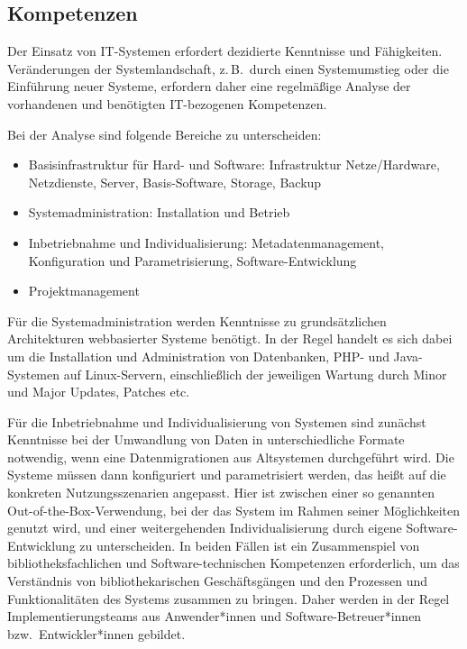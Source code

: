 \documentclass[
  11pt,
  letterpaper,
  DIV=11,
  twoside]{scrreprt}
\begin{document}
\subsection{Kompetenzen}\label{kompetenzen}

Der Einsatz von IT-Systemen erfordert dezidierte Kenntnisse und
Fähigkeiten. Veränderungen der Systemlandschaft, z.\,B.~durch einen
Systemumstieg oder die Einführung neuer Systeme, erfordern daher eine
regelmäßige Analyse der vorhandenen und benötigten IT-bezogenen
Kompetenzen.

Bei der Analyse sind folgende Bereiche zu unterscheiden:

\begin{itemize}
\item
  Basisinfrastruktur für Hard- und Software: Infrastruktur
  Netze/Hardware, Netzdienste, Server, Basis-Software, Storage, Backup
\item
  Systemadministration: Installation und Betrieb
\item
  Inbetriebnahme und Individualisierung: Metadatenmanagement,
  Konfiguration und Parametrisierung, Software-Entwicklung
\item
  Projektmanagement
\end{itemize}

Für die Systemadministration werden Kenntnisse zu grundsätzlichen
Architekturen webbasierter Systeme benötigt. In der Regel handelt es
sich dabei um die Installation und Administration von Datenbanken, PHP-
und Java-Systemen auf Linux-Servern, einschließlich der jeweiligen
Wartung durch Minor und Major Updates, Patches etc.

Für die Inbetriebnahme und Individualisierung von Systemen sind zunächst
Kenntnisse bei der Umwandlung von Daten in unterschiedliche Formate
notwendig, wenn eine Datenmigrationen aus Altsystemen durchgeführt wird.
Die Systeme müssen dann konfiguriert und parametrisiert werden, das
heißt auf die konkreten Nutzungsszenarien angepasst. Hier ist zwischen
einer so genannten Out-of-the-Box-Verwendung, bei der das System im
Rahmen seiner Möglichkeiten genutzt wird, und einer weitergehenden
Individualisierung durch eigene Software-Entwicklung zu unterscheiden.
In beiden Fällen ist ein Zusammenspiel von bibliotheksfachlichen und
Software-technischen Kompetenzen erforderlich, um das Verständnis von
bibliothekarischen Geschäftsgängen und den Prozessen und
Funktionalitäten des Systems zusammen zu bringen. Daher werden in der
Regel Implementierungsteams aus Anwender*innen und
Software-Betreuer*innen bzw.~Entwickler*innen gebildet.
\end{document}
